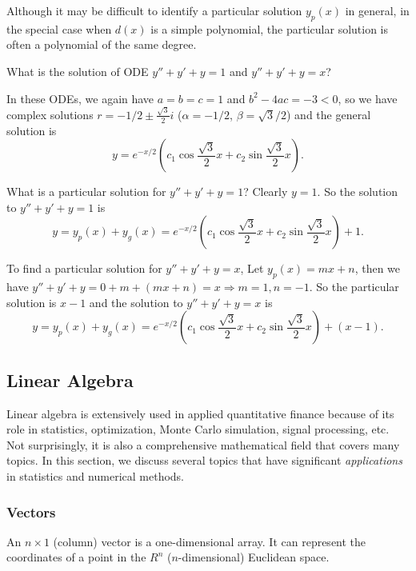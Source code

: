 
Although it may be difficult to identify a particular solution $y_p(x)$ in general, in the
special case when $d(x)$ is a simple polynomial, the particular solution is often a
polynomial of the same degree.

\begin{problem}{What is the solution of ODE $y''+y'+y=1$ and $y''+y'+y=x$?}
\end{problem}
\begin{solution}
In these ODEs, we again have $a=b=c=1$ and $b^2-4ac=-3<0$, so we have complex
solutions $r=-1/2\pm\frac{\sqrt{3}}{2}i$ ($\alpha=-1/2$, $\beta=\sqrt{3}/2$) and the general
solution is
\[
y=e^{-x/2}\left(c_1\cos\frac{\sqrt{3}}{2}x+c_2\sin\frac{\sqrt{3}}{2}x\right).
\]

What is a particular solution for $y''+y'+y=1$? Clearly $y=1$. So the solution to
$y''+y'+y=1$ is
\[
y=y_p(x)+y_g(x)=e^{-x/2}\left(c_1\cos\frac{\sqrt{3}}{2}x+c_2\sin\frac{\sqrt{3}}{2}x\right)+1.
\]

To find a particular solution for $y''+y'+y=x$, Let $y_p(x)=mx+n$, then we have
$y''+y'+y=0+m+(mx+n)=x\Rightarrow m=1,n=-1$. So the particular solution is
$x-1$ and the solution to $y''+y'+y=x$ is
\[
y=y_p(x)+y_g(x)=e^{-x/2}\left(c_1\cos\frac{\sqrt{3}}{2}x+c_2\sin\frac{\sqrt{3}}{2}x\right)+(x-1).
\]
\end{solution}

\subsection{Linear Algebra}

Linear algebra is extensively used in applied quantitative finance because of its role in
statistics, optimization, Monte Carlo simulation, signal processing, etc. Not surprisingly,
it is also a comprehensive mathematical field that covers many topics. In this section, we
discuss several topics that have significant \emph{applications} in statistics and numerical
methods.

\subsubsection*{Vectors}

An $n\times1$ (column) vector is a one-dimensional array. It can represent the coordinates
of a point in the $R^n$ ($n$-dimensional) Euclidean space.



